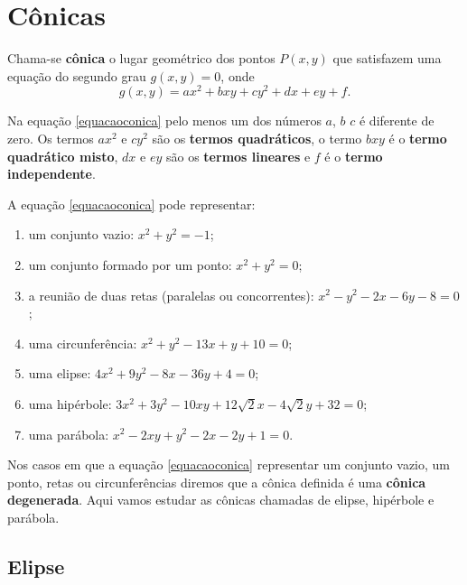 \section{Cônicas}

\begin{definicao}
    Chama-se \textbf{cônica} o lugar geométrico dos pontos $P(x,y)$ que satisfazem uma equação do segundo grau $g(x,y) = 0$, onde
    \begin{equation}\label{equacaoconica}
        g(x,y) = ax^2 + bxy + cy^2 + dx + ey + f.
    \end{equation}
\end{definicao}

Na equação \eqref{equacaoconica} pelo menos um dos números $a$, $b$ $c$ é diferente de zero. Os termos $ax^2$ e $cy^2$ são os \textbf{termos quadráticos},
o termo $bxy$ é o \textbf{termo quadrático misto}, $dx$ e $ey$ são os \textbf{termos lineares} e $f$ é o \textbf{termo independente}.
   

A equação \eqref{equacaoconica} pode representar:
\begin{enumerate}[label=({\arabic*})]
    \item um conjunto vazio: $x^2 + y^2 = -1$;
    \item um conjunto formado por um ponto: $x^2 + y^2 = 0$;
    \item a reunião de duas retas (paralelas ou concorrentes): $x^2 - y^2 - 2x - 6y -8 =0$;
    \item uma circunferência: $x^2 + y^2 - 13x + y + 10 = 0$;
    \item uma elipse: $4x^2 + 9y^2 - 8x - 36y + 4 = 0$;
    \item uma hipérbole: $3x^2 + 3y^2 - 10xy + 12\sqrt{2}x - 4\sqrt{2}y + 32 = 0$;
    \item uma parábola: $x^2 - 2xy + y^2 -2x - 2y + 1 = 0$.
\end{enumerate}

Nos casos em que a equação \eqref{equacaoconica} representar um conjunto vazio, um ponto, retas ou circunferências diremos que a cônica definida é uma
\textbf{cônica degenerada}. Aqui vamos estudar as cônicas chamadas de elipse, hipérbole e parábola.

\subsection{Elipse}

